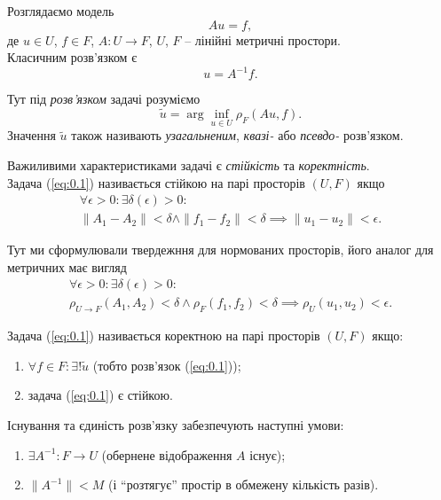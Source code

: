 \begin{example}
	Розглядаємо модель
	\begin{equation}
		\label{eq:0.1}
		A u = f,
	\end{equation}
	де $u \in U$, $f \in F$, $A: U \to F$, $U$, $F$ -- лінійні метричні простори. \\

	Класичним розв'язком є
	\begin{equation}
		\label{eq:0.2}
		u = A^{-1} f.
	\end{equation}

	Тут під \textit{розв'язком} задачі розуміємо
	\begin{equation}
		\label{eq:0.3}
		\tilde u = \arg \inf_{u \in U} \rho_F (A u, f).
	\end{equation}
	Значення $\tilde u$ також називають \textit{узагальненим}, \textit{квазі-} або \textit{псевдо-} розв'язком.
\end{example}

Важиливими характеристиками задачі є \textit{стійкість} та \textit{коректність}. \\

Задача (\ref{eq:0.1}) називається стійкою на парі просторів $(U, F)$ якщо 
\begin{multline}
	\label{eq:0.4}
	\forall \epsilon > 0: \exists \delta(\epsilon) > 0 : \\
	\| A_1 - A_2 \| < \delta \wedge \| f_1 - f_2 \| < \delta \implies \| u_1 - u_2 \| < \epsilon.
\end{multline}

\begin{remark*}
	Тут ми сформулювали твердежння для нормованих просторів, його аналог для метричних має вигляд 
	\begin{multline}
		\label{eq:0.5}
		\forall \epsilon > 0: \exists \delta(\epsilon) > 0 : \\
		\rho_{U\to F} (A_1, A_2) < \delta \wedge \rho_F (f_1, f_2) < \delta \implies \rho_U(u_1, u_2) < \epsilon.
	\end{multline}
\end{remark*}

Задача (\ref{eq:0.1}) називається коректною на парі просторів $(U, F)$ якщо:
\begin{enumerate}
	\item $\forall f \in F: \exists! \tilde u$ (тобто розв'язок (\ref{eq:0.1}));
	\item задача (\ref{eq:0.1}) є стійкою.
\end{enumerate}

\begin{remark*}
	Існування та єдиність розв'язку забезпечують наступні умови:
	\begin{enumerate}
		\item $\exists A^{-1}: F \to U$ (обернене відображення $A$ існує); 
		\item $\| A^{-1} \| < M$ (і ``розтягує'' простір в обмежену кількість разів).
	\end{enumerate}
\end{remark*}